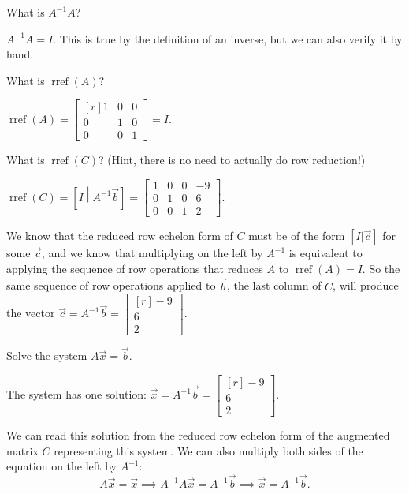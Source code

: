 \documentclass{problemset}
\DeclareMathOperator{\Rref}{rref}
\newcommand{\rref}{\Rref}
\newcommand{\mat}[1]{\begin{bmatrix*}[r]#1\end{bmatrix*}}
\begin{document}
	\begin{parts}
		\item What is $A^{-1}A$?
			\begin{solution}
				$A^{-1}A = I$. This is true by the definition of an inverse, 
				but we can also verify it by hand.
			\end{solution}
		\item What is $\rref(A)$?
			\begin{solution}
				$\rref(A) = \mat{1&0&0\\0&1&0\\0&0&1} = I$. 
			\end{solution}
		\item What is $\rref(C)$? (Hint, there is no need to actually do row reduction!)
			\begin{solution}
				$\rref(C) = \left[I\middle|A^{-1}\vec b\right]
				=\left[
					\begin{array}{rrr|r}
						1&0&0&-9\\
						0&1&0&6\\
						0&0&1&2
					\end{array}
				\right]$.

				We know that the reduced row echelon form of $C$ must be of the 
				form $[I|\vec c]$ for some $\vec c$, and we know that multiplying
				on the left by $A^{-1}$ is equivalent to applying the sequence of
				row operations that reduces $A$ to $\rref(A)=I$. So the same sequence
				of row operations applied to $\vec b$, the last column of $C$, 
				will produce the vector $\vec c=A^{-1}\vec b=\mat{-9\\6\\2}$. 
			\end{solution}

		\item Solve the system $A\vec x=\vec b$.
			\begin{solution}
				The system has one solution: $\vec x=A^{-1}\vec b=\mat{-9\\6\\2}$.

				We can read this solution from the reduced row echelon form of the
				augmented matrix $C$ representing this system. We can also multiply
				both sides of the equation on the left by $A^{-1}$:
				\[
					A\vec x=\vec x 
					\implies A^{-1}A\vec x=A^{-1}\vec b 
					\implies \vec x=A^{-1}\vec b.
				\]
			\end{solution}
	\end{parts}
\end{document}

